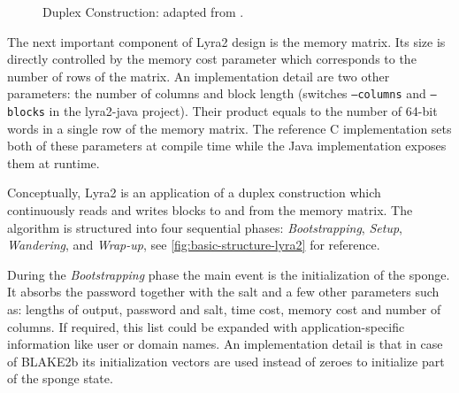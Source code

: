 \begin{figure}
  \caption{Duplex Construction: adapted from \cite{bertoni:2011:duplexing,marcos:2015:lyra2}.}
  \label{figure:duplex-construction}
\end{figure}

The next important component of Lyra2 design is the memory matrix. Its size is directly controlled by the memory cost parameter which corresponds to the number of rows of the matrix. An implementation detail are two other parameters: the number of columns and block length (switches \texttt{--columns} and \texttt{--blocks} in the lyra2-java project). Their product equals to the number of 64-bit words in a single row of the memory matrix. The reference C implementation sets both of these parameters at compile time while the Java implementation exposes them at runtime.

Conceptually, Lyra2 is an application of a duplex construction which continuously reads and writes blocks to and from the memory matrix. The algorithm is structured into four sequential phases: \emph{Bootstrapping}, \emph{Setup}, \emph{Wandering}, and \emph{Wrap-up}, see \autoref{fig:basic-structure-lyra2} for reference.

During the \emph{Bootstrapping} phase the main event is the initialization of the sponge. It absorbs the password together with the salt and a few other parameters such as: lengths of output, password and salt, time cost, memory cost and number of columns. If required, this list could be expanded with application-specific information like user or domain names. An implementation detail is that in case of BLAKE2b its initialization vectors are used instead of zeroes to initialize part of the sponge state.

